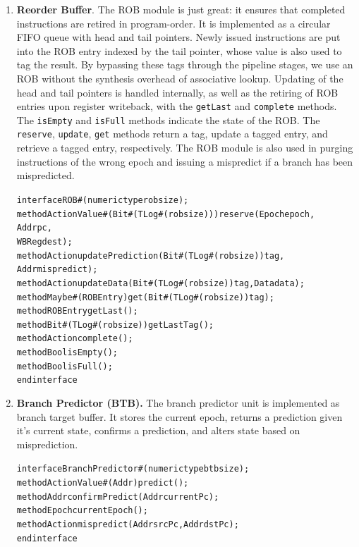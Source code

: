 \documentclass[12pt]{article}
\begin{document}
\begin{enumerate}
    \item \textbf{Reorder Buffer}. The ROB module is just great: it ensures that completed instructions are
retired in program-order. It is implemented as a circular FIFO queue with head
and tail pointers. Newly issued instructions are put into the ROB entry
indexed by the tail pointer, whose value is also used to tag the result. By
bypassing these tags through the pipeline stages, we use an ROB without the
synthesis overhead of associative lookup. Updating of the head and tail
pointers is handled internally, as well as the retiring of ROB entries upon
register writeback, with the \verb=getLast= and \verb=complete= methods. The
\verb=isEmpty= and \verb=isFull= methods indicate the state of the ROB. The
\verb=reserve=, \verb=update=, \verb=get= methods return a tag, update a
tagged entry, and retrieve a tagged entry, respectively. The ROB module is
also used in purging instructions of the wrong epoch and issuing a mispredict
if a branch has been mispredicted.
    
    \begin{alltt}
        interface ROB#(numeric type robsize);
          method ActionValue#(Bit#(TLog#(robsize))) reserve(Epoch epoch, 
                                                            Addr pc, 
                                                            WBReg dest);
          method Action updatePrediction(Bit#(TLog#(robsize)) tag, 
                                         Addr mispredict);
          method Action updateData(Bit#(TLog#(robsize)) tag, Data data);
          method Maybe#(ROBEntry) get(Bit#(TLog#(robsize)) tag);
          method ROBEntry getLast();
          method Bit#(TLog#(robsize)) getLastTag();
          method Action complete();
          method Bool isEmpty();
          method Bool isFull();
        endinterface
    \end{alltt}
    \item \textbf{Branch Predictor (BTB).} The branch predictor unit is implemented as branch target buffer. It
    stores the current epoch, returns a prediction given it's current state, confirms a prediction, and 
    alters state based on misprediction. 
    \begin{alltt}
        interface BranchPredictor#(numeric type btbsize);
        	method ActionValue#(Addr) predict();
        	method Addr confirmPredict(Addr currentPc);
        	method Epoch currentEpoch();
        	method Action mispredict(Addr srcPc, Addr dstPc);
        endinterface
    \end{alltt}

\end{enumerate}
\end{document}
